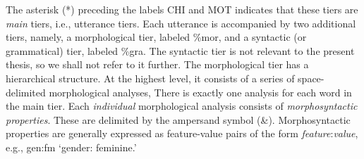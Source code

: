 The asterisk (*) 
preceding the labels CHI and \textsf{MOT} indicates 
that these tiers are \emph{main} tiers, i.e.,  
utterance tiers. Each utterance is accompanied by two additional tiers, 
namely, a morphological tier, labeled \textsf{\%mor}, and a syntactic 
(or grammatical) tier, labeled \textsf{\%gra}. 
The syntactic tier is not relevant to the present thesis,
so we shall not refer to it further.
The morphological 
tier has a hierarchical structure. At the highest level, it consists of a 
series of space-delimited morphological analyses, 
There is exactly one analysis for each word in the main tier.  
Each \emph{individual} morphological analysis consists
of \textit{morphosyntactic properties}. These are delimited by the ampersand symbol (\textsf{\&}). 
Morphosyntactic properties are 
generally expressed as feature-value pairs of the 
form \textsf{\textit{feature}:\textit{value}}, e.g., \textsf{gen:fm} `gender: feminine.'


